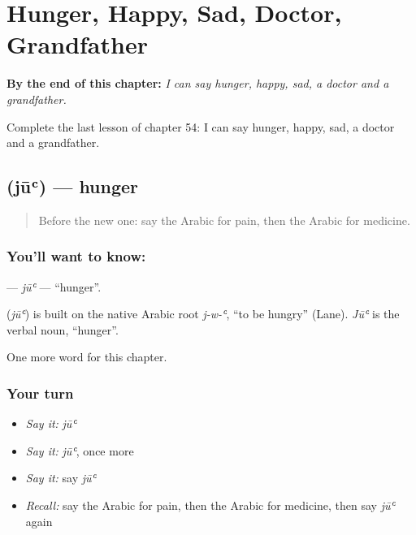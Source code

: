 
\chapter{Hunger, Happy, Sad, Doctor, Grandfather}
\label{ch:ar-hunger-happy-sad-doctor-grandfather}

\begin{chapteropening}
\textbf{By the end of this chapter:} \emph{I can say hunger, happy, sad, a doctor and a grandfather.}

Complete the last lesson of chapter 54: I can say hunger, happy, sad, a doctor and a grandfather.
\end{chapteropening}

\section[\texorpdfstring{\ar{جوع} (jūʿ)}{جوع (jūʿ)}]{ (jūʿ) — hunger}

\label{lesson:AR-C54-ju}



\begin{quote}
Before the new one: say the Arabic for pain, then the Arabic for medicine.
\end{quote}

\subsection*{You'll want to know: }
\textbf{} — \emph{jūʿ} — \textquotedblleft{}hunger\textquotedblright{}.

\begin{cousinweb}
\textbf{} (\emph{jūʿ}) is built on the native Arabic root \emph{j-w-ʿ}, \textquotedblleft{}to be hungry\textquotedblright{} (Lane). \emph{Jūʿ} is the verbal noun, \textquotedblleft{}hunger\textquotedblright{}.
\end{cousinweb}

\begin{grammarlens}[title={What you've built}]
One more word for this chapter.
\end{grammarlens}

\subsection*{Your turn}
\begin{itemize}
\raggedright
  \item \emph{Say it:} \emph{jūʿ}
  \item \emph{Say it:} \emph{jūʿ}, once more
  \item \emph{Say it:} say \emph{jūʿ}
  \item \emph{Recall:} say the Arabic for pain, then the Arabic for medicine, then say \emph{jūʿ} again
\end{itemize}


